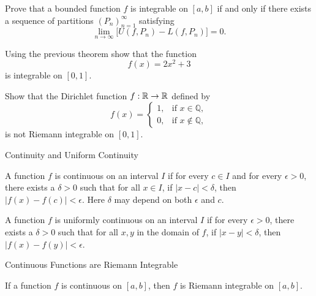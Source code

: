\documentclass[12pt,a4paper]{article}
\begin{document}
\clearpage

\begin{theorem}
Prove that a bounded function \(f\) is integrable on \([a,b]\) if and only if there exists a sequence of partitions
    \(
    (P_n)_{n=1}^{\infty}
    \)
    satisfying
    \[
    \lim_{n\to\infty}\bigl[U(f,P_n)-L(f,P_n)\bigr]=0.
    \]
\end{theorem}

\clearpage

\begin{problem}
    Using the previous theorem show that the function
    \[
    f(x)=2x^2+3
\]
    is integrable on \([0,1]\).
\end{problem}

\clearpage



\begin{problem}
Show that the Dirichlet function $f:\mathbb{R}\to \mathbb{R}$ defined by
\[
f(x)=
\begin{cases}
1,&\text{if }x\in\mathbb{Q},\\
0,&\text{if }x \notin \mathbb{Q},
\end{cases}
\]
is not Riemann integrable on $[0,1]$.
\end{problem}

\clearpage

\clearpage

\begin{heading}
    Continuity and Uniform Continuity
\end{heading}

\vspace{10pt}

\begin{definition}[Continuity]
A function $f$ is continuous on an interval $I$ if for every $c \in I$ and for every $\epsilon > 0$, there exists a $\delta > 0$ such that for all $x \in I$, if $|x - c| < \delta$, then $|f(x) - f(c)| < \epsilon$. Here $\delta$ may depend on both $\epsilon$ and $c$.
\end{definition}


\vspace{100pt}

\begin{definition}
A function $f$ is uniformly continuous on an interval $I$ if for every $\epsilon > 0$, there exists a $\delta > 0$ such that for all $x, y$ in the domain of $f$, if $|x - y| < \delta$, then $|f(x) - f(y)| < \epsilon$.
\end{definition}

\clearpage


\begin{heading}
    Continuous Functions are Riemann Integrable
\end{heading}

\vspace{10pt}

\begin{theorem}
If a function $f$ is continuous on $[a,b]$, then $f$ is Riemann integrable on $[a,b]$.
\end{theorem}







\EndPage
\end{document}
